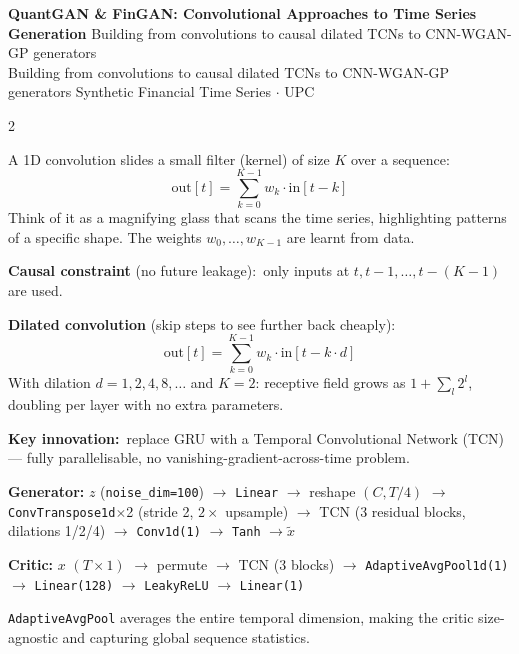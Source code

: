 \documentclass[10pt]{article}
\newcommand{\navybox}[2]{\begin{tcolorbox}[mybox={Navy}{LBg},title={#1}]#2\end{tcolorbox}}
\newcommand{\pagehead}[2]{%
  \begin{tcolorbox}[enhanced,arc=0pt,outer arc=0pt,boxrule=0pt,
    colback=Navy,colframe=Navy,
    top=5pt,bottom=5pt,left=8pt,right=8pt,
    before skip=0pt,after skip=10pt]
  {\color{white}\large\bfseries #1}%
  \ifx\relax#2\relax\else\\[1pt]{\color{blue!30!white}\small #2}\fi
  \hfill{\color{blue!20!white}\footnotesize Synthetic Financial Time Series $\cdot$ UPC}
  \end{tcolorbox}}
\begin{document}
\clearpage

\pagehead{QuantGAN \& FinGAN: Convolutional Approaches to Time Series Generation}
         {Building from convolutions to causal dilated TCNs to CNN-WGAN-GP generators}

\begin{multicols}{2}

\navybox{What is a Convolution? (From Scratch)}{%
A 1D convolution slides a small filter (kernel) of size $K$ over a sequence:
\begin{equation*}
  \text{out}[t] = \sum_{k=0}^{K-1} w_k \cdot \text{in}[t - k]
\end{equation*}
Think of it as a magnifying glass that scans the time series, highlighting patterns of a specific shape. The weights $w_0,\ldots,w_{K-1}$ are learnt from data.

\textbf{Causal constraint} (no future leakage):\ only inputs at $t, t-1, \ldots, t-(K-1)$ are used.

\textbf{Dilated convolution} (skip steps to see further back cheaply):
\begin{equation*}
  \text{out}[t] = \sum_{k=0}^{K-1} w_k \cdot \text{in}[t - k \cdot d]
\end{equation*}
With dilation $d=1,2,4,8,\ldots$ and $K=2$: receptive field grows as $1+\sum_l 2^l$, doubling per layer with no extra parameters.}

\begin{tcolorbox}[mybox={QGcol}{BBg},title={QuantGAN --- TCN-based WGAN-GP (Wiese et al., 2020)}]
\textbf{Key innovation:}\ replace GRU with a Temporal Convolutional Network (TCN) --- fully parallelisable, no vanishing-gradient-across-time problem.

\textbf{Generator:} $z$ (\texttt{noise\_dim=100}) $\to$ \texttt{Linear} $\to$ reshape $(C, T/4)$ $\to$ \texttt{ConvTranspose1d}$\times$2 (stride 2, $2\times$ upsample) $\to$ TCN (3 residual blocks, dilations 1/2/4) $\to$ \texttt{Conv1d(1)} $\to$ \texttt{Tanh} $\to \tilde{x}$

\textbf{Critic:} $x$ $(T\times 1)$ $\to$ permute $\to$ TCN (3 blocks) $\to$ \texttt{AdaptiveAvgPool1d(1)} $\to$ \texttt{Linear(128)} $\to$ \texttt{LeakyReLU} $\to$ \texttt{Linear(1)}

\texttt{AdaptiveAvgPool} averages the entire temporal dimension, making the critic size-agnostic and capturing global sequence statistics.
\end{tcolorbox}


\end{multicols}
\end{document}
